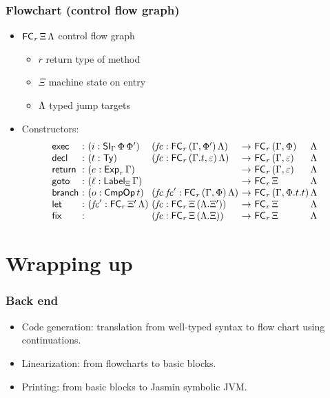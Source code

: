 \documentclass[t,fleqn,usenames,dvipsnames]{beamer}
\newcommand{\Exp}[2][]{\mathsf{Exp}_{#1}\,#2}
\newcommand{\vrt}{\mathit{r}}
\newcommand{\tCmpOp}{\mathsf{CmpOp}}
\newcommand{\CmpOp}[1]{\tCmpOp\,#1}
\newcommand{\tdecl}{\mathsf{decl}}
\newcommand{\treturn}{\mathsf{return}}
\newcommand{\tSI}{\mathsf{SI}}
\newcommand{\SI}[3][]{\tSI_{#1}\,#2\,#3}
\newcommand{\tLabel}{\mathsf{Label}}
\newcommand{\Label}[2][]{\tLabel_{#1}\,{#2}}
\newcommand{\tFC}{\mathsf{FC}}
\newcommand{\FC}[3][]{\tFC_{#1}\,#2\,#3}
\newcommand{\tlet}{\mathsf{let}}
\newcommand{\tfix}{\mathsf{fix}}
\newcommand{\texec}{\mathsf{exec}}
\newcommand{\vfc}{\mathit{fc}}
\newcommand{\tbranch}{\mathsf{branch}}
\newcommand{\tgoto}{\mathsf{goto}}
\begin{document}
\begin{frame}%
  \frametitle{Flowchart (control flow graph)}
  \vspace{-3ex}
  \begin{itemize}
  \item $\FC[\vrt] \Xi \GL$ control flow graph
    \begin{itemize}
    \item $\vrt$ return type of method
    \item $\Xi$ machine state on entry
    \item $\Lambda$ typed jump targets
    \end{itemize}
  \item Constructors:
\[
\begin{array}{@{}l@{~}c@{~}l@{}l@{~}c@{~}l@{}l}
  \texec   & : & (i : \SI[\Gamma] \Phi {\Phi'})\ & (\vfc : \FC[\vrt] {(\Gamma,\Phi')} \GL)
                 & \to & \FC[\vrt] {(\Gamma,\Phi)} {&\GL} \\
  \tdecl   & : & (t : \Ty)\ & (\vfc : \FC[\vrt] {(\Gamma.t,\Ge)} \GL) & \to & \FC[\vrt] {(\Gamma,\Ge)} {&\GL} \\
  \treturn & : & (e : \Exp[\vrt] \Gamma) & & \to & \FC[\vrt] {(\Gamma,\Ge)} {&\GL} \\
  \tgoto   & : & (\ell : \Label[\Xi]\Gamma) & & \to & \FC[\vrt] \Xi {&\GL} \\
  \tbranch & : & (o : \CmpOp t) \ & (\vfc\;\vfc' : \FC[\vrt] {(\Gamma,\Phi)} \GL) & \to & \FC[\vrt] {(\Gamma,\Phi.t.t)} {&\GL} \\
  \tlet    & : & (\vfc' : \FC[\vrt] {\Xi'} \GL)\ & (\vfc : \FC[\vrt] \Xi {(\GL.\Xi')}) & \to & \FC[\vrt] \Xi {&\GL} \\
  \tfix    & : & & (\vfc : \FC[\vrt] \Xi {(\GL.\Xi)}) & \to & \FC[\vrt] \Xi {&\GL} \\
\end{array}
\]
  \end{itemize}
\end{frame}


\section{Wrapping up}


\begin{frame}%
  \frametitle{Back end}
  \vspace{-3ex}
  \begin{itemize}
  \item Code generation: translation from well-typed syntax to flow chart using continuations.
  \item Linearization: from flowcharts to basic blocks.
  \item Printing: from basic blocks to Jasmin symbolic JVM.
  \end{itemize}
\end{frame}
\end{document}
